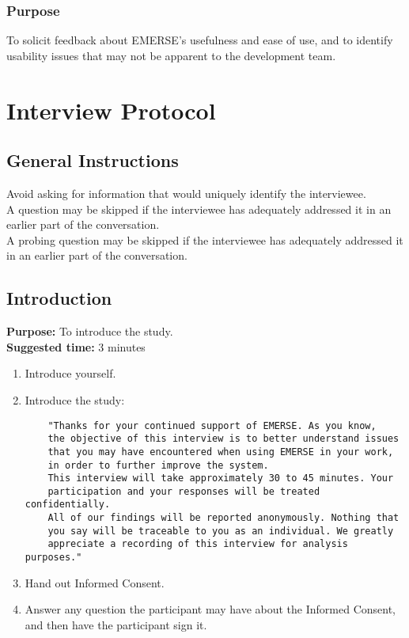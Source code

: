\subsubsection{Purpose}
To solicit feedback about EMERSE’s usefulness and ease of use, and to identify usability issues that may not be apparent to the development team. 


\section{Interview Protocol}
\subsection{General Instructions}
Avoid asking for information that would uniquely identify the interviewee.\\
A question may be skipped if the interviewee has adequately addressed it in an earlier part of the conversation.\\
A probing question may be skipped if the interviewee has adequately addressed it in an earlier part of the conversation. 

\subsection{Introduction}
\textbf{Purpose:} To introduce the study.\\
\textbf{Suggested time:} 3 minutes
\begin{enumerate}
    \item Introduce yourself.
    \item Introduce the study:
        \begin{verbatim}
    "Thanks for your continued support of EMERSE. As you know, 
    the objective of this interview is to better understand issues 
    that you may have encountered when using EMERSE in your work, 
    in order to further improve the system.
    This interview will take approximately 30 to 45 minutes. Your 
    participation and your responses will be treated confidentially. 
    All of our findings will be reported anonymously. Nothing that 
    you say will be traceable to you as an individual. We greatly 
    appreciate a recording of this interview for analysis purposes."
        \end{verbatim}
    \item Hand out Informed Consent.
    \item Answer any question the participant may have about the Informed Consent, and then have the participant sign it.
\end{enumerate}


